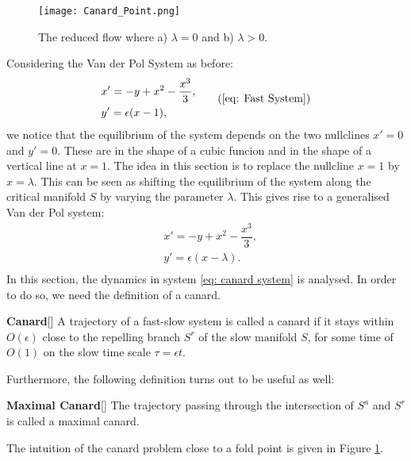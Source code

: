 \begin{figure}[h!]
	\centering
	\texttt{[image: Canard\_Point.png]}
	\caption{The reduced flow where a) $\lambda=0$ and b) $\lambda>0$.}
	\label{fig: Canard Point}
\end{figure}



Considering the Van der Pol System as before:
\begin{equation}
\begin{aligned}
&x'=-y+x^2-\dfrac{x^3}{3},\\
&y'=\epsilon(x-1),\\
\end{aligned}
\tag{\ref{eq: Fast System}}
\end{equation}
we notice that the equilibrium of the system depends on the two nullclines $ x'=0$ and $y'=0$. These are in the shape of a cubic funcion and in the shape of a vertical line at $x=1$. 
The idea in this section is to replace the nullcline $x=1$ by $x = \lambda$. This can be seen as shifting the equilibrium of the system along the critical manifold $S$ by varying the parameter $\lambda$.
This gives rise to a generalised Van der Pol system:
\begin{equation}
\begin{aligned}
&x'=-y+x^2-\dfrac{x^3}{3},\\
&y'=\epsilon(x-\lambda).\\
\end{aligned}
\label{eq: canard system}
\end{equation}
In this section, the dynamics in system \ref{eq: canard system} is analysed. In order to do so, we need the definition of a canard.
\begin{definition}{\textbf{ Canard}}[\citealp{Kuehn}]
A trajectory of a fast-slow system is called a canard if it stays within $O(\epsilon)$ close to the repelling branch $S^r$ of the slow manifold $S$, for some time of $O(1)$ on the slow time scale $\tau = \epsilon t$.
\end{definition}
Furthermore, the following definition turns out to be useful as well:
\begin{definition}{\textbf{Maximal Canard}}[\citealp{Kuehn}] \label{maxcanard}
The trajectory passing through the intersection of $S^a$ and $S^r$ is called a maximal canard. 
\end{definition}
The intuition of the canard problem close to a fold point is given in Figure \ref{fig: Canard Point}.

